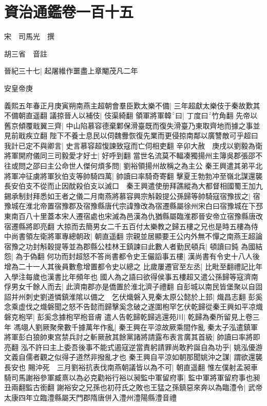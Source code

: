 \chapter{資治通鑑卷一百十五}
宋　司馬光　撰

胡三省　音註

晉紀三十七|{
	起屠維作噩盡上章閹茂凡二年}


安皇帝庚

義熙五年春正月庚寅朔南燕主超朝會羣臣歎太樂不備|{
	三年超獻太樂伎于秦故歎其不備朝直遥翻}
議掠晉人以補伎|{
	伎渠綺翻}
領軍將軍韓曰|{
	丁度曰竹角翻}
先帝以舊京傾覆戢翼三齊|{
	中山陷慕容德棄鄴保滑臺既而復失滑臺乃東取齊地而據之事並見前戢疾立翻}
陛下不養士息民以伺魏釁恢復先業而更侵掠南鄰以廣讐敵可乎超曰我計已定不與卿言|{
	史言慕容超愎諫致寇而亡伺相吏翻}
辛卯大赦　庚戌以劉毅為衛將軍開府儀同三司毅愛才好士|{
	好呼到翻}
當世名流莫不輻凑獨揚州主簿吳郡張邵不往或問之邵曰主公命世人傑何煩多問|{
	劉裕領揚州故稱之為主公}
秦王興遣其弟平北將軍冲征虜將軍狄伯支等帥騎四萬|{
	帥讀曰率騎奇寄翻}
擊夏王勃勃冲至嶺北謀還襲長安伯支不從而止因酖殺伯支以滅口　秦王興遣使册拜譙縱為大都督相國蜀王加九錫承制封拜悉如王者之儀二月南燕將慕容興宗斛穀提公孫歸等帥騎寇宿豫拔之|{
	宿豫城在淮北帝置宿豫郡及宿豫縣唐代宗諱豫改為宿遷縣屬徐州宋白曰宿豫城在下邳東南百八十里蓋本宋人遷宿處也宋滅為邑漢為仇猶縣屬臨淮郡晉安帝立宿豫縣唐改宿遷縣將即亮翻}
大掠而去簡男女二千五百付太樂教之歸五樓之兄也是時五樓為侍中尚書領左衛將軍專總朝政|{
	朝直遥翻}
宗親並居顯要王公内外無不憚之南燕王超論宿豫之功封斛穀提等並為郡縣公桂林王鎮諫曰此數人者勤民頓兵|{
	頓讀曰鈍}
為國結怨|{
	為于偽翻}
何功而封超怒不答尚書都令史王儼謟事五樓|{
	漢尚書有令史十八人後增為二十一人其後員數愈增置都令史以總之}
比歲屢遷官至左丞|{
	比毗至翻禮記比年入學注每歲也漢書比年頻年也}
國人為之語曰欲得侯事五樓超又遣公孫歸等寇濟南俘男女千餘人而去|{
	此濟南郡亦是僑置於淮北濟子禮翻}
自彭城以南民皆堡聚以自固詔并州刺史劉道憐鎮淮隂以備之　乞伏熾磐入見秦太原公懿於上邽|{
	熾昌志翻}
彭奚念乘虚伐之熾磐聞之怒不告懿而歸擊奚念破之遂圍枹罕乞伏乾歸從秦王興如平凉熾磐克枹罕|{
	彭奚念據枹罕枹音膚}
遣人告乾歸乾歸逃還苑川|{
	乾歸為秦所留見上卷三年}
馮翊人劉厥聚衆數千據萬年作亂|{
	秦王興在平涼故厥乘間作亂}
秦太子泓遣鎮軍將軍彭白狼帥東宫禁兵討之斬厥赦其餘黨諸將請露布表言廣其首級|{
	帥讀曰率將即亮翻}
泓不許曰主上委吾後事不能式遏寇逆當責躬請罪尚敢矜誕自為功乎|{
	姚泓優游文義自儒者觀之似得子道然非撥亂才也}
秦王興自平涼如朝那聞姚沖之謀|{
	謂欲還襲長安也}
賜沖死　三月劉裕抗表伐南燕朝議皆以為不可|{
	朝直遥翻}
惟左僕射孟昶車騎司馬謝裕參軍臧熹以為必克勸裕行裕以昶監中軍留府事|{
	監中軍將軍留府事也昶丑兩翻監古銜翻}
謝裕安之兄孫也初苻氏之敗也王猛之孫鎮惡來奔以為臨澧令|{
	武帝太康四年立臨澧縣屬天門郡隋唐併入澧州澧陽縣澧音禮}
